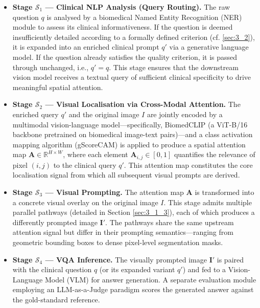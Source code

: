 \begin{itemize}
    \item \textbf{Stage $\mathcal{S}_1$ --- Clinical NLP Analysis (Query Routing).} The raw question $q$ is analysed by a biomedical Named Entity Recognition (NER) module to assess its clinical informativeness. If the question is deemed insufficiently detailed according to a formally defined criterion (cf. \ref{sec:3_2}), it is expanded into an enriched clinical prompt $q'$ via a generative language model. If the question already satisfies the quality criterion, it is passed through unchanged, i.e., $q' = q$. This stage ensures that the downstream vision model receives a textual query of sufficient clinical specificity to drive meaningful spatial attention.

    \item \textbf{Stage $\mathcal{S}_2$ --- Visual Localisation via Cross-Modal Attention.} The enriched query $q'$ and the original image $I$ are jointly encoded by a multimodal vision-language model—specifically, BiomedCLIP (a ViT-B/16 backbone pretrained on biomedical image-text pairs)—and a class activation mapping algorithm (gScoreCAM) is applied to produce a spatial attention map $\mathbf{A} \in \mathbb{R}^{H \times W}$, where each element $\mathbf{A}_{i,j} \in [0, 1]$ quantifies the relevance of pixel $(i, j)$ to the clinical query $q'$. This attention map constitutes the core localisation signal from which all subsequent visual prompts are derived.

    \item \textbf{Stage $\mathcal{S}_3$ --- Visual Prompting.} The attention map $\mathbf{A}$ is transformed into a concrete visual overlay on the original image $I$. This stage admits multiple parallel pathways (detailed in Section \ref{sec:3_1_3}), each of which produces a differently prompted image $\mathbf{I}'$. The pathways share the same upstream attention signal but differ in their prompting semantics—ranging from geometric bounding boxes to dense pixel-level segmentation masks.

    \item \textbf{Stage $\mathcal{S}_4$ --- VQA Inference.} The visually prompted image $\mathbf{I}'$ is paired with the clinical question $q$ (or its expanded variant $q'$) and fed to a Vision-Language Model (VLM) for answer generation. A separate evaluation module employing an LLM-as-a-Judge paradigm scores the generated answer against the gold-standard reference.
\end{itemize}

